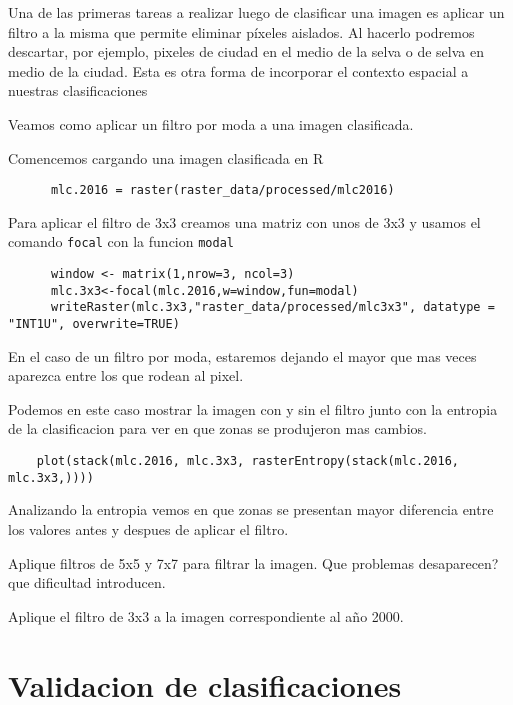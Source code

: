 Una de las primeras tareas a realizar luego de clasificar una imagen es
aplicar un filtro a la misma que permite eliminar p\'ixeles aislados. Al
hacerlo podremos descartar, por ejemplo, pixeles de ciudad en el medio de la selva
o de selva en medio de la ciudad. Esta es otra forma de incorporar el contexto
espacial a nuestras clasificaciones
\begin{exa}
  Veamos como aplicar un filtro por moda a una imagen clasificada.

  Comencemos cargando una imagen clasificada en R
  \begin{lstlisting}
      mlc.2016 = raster(raster_data/processed/mlc2016)
  \end{lstlisting}

  Para aplicar el filtro de 3x3 creamos una matriz con unos de 3x3 y usamos
  el comando \texttt{focal} con la funcion \texttt{modal}

  \begin{lstlisting}
      window <- matrix(1,nrow=3, ncol=3)
      mlc.3x3<-focal(mlc.2016,w=window,fun=modal)
      writeRaster(mlc.3x3,"raster_data/processed/mlc3x3", datatype = "INT1U", overwrite=TRUE)
  \end{lstlisting}
  En el caso de un filtro por moda, estaremos dejando el mayor que mas veces
  aparezca entre los que rodean al pixel.

  Podemos en este caso mostrar la imagen con y sin el filtro junto con la entropia
  de la clasificacion para ver en que zonas se produjeron mas cambios.

  \begin{lstlisting}
    plot(stack(mlc.2016, mlc.3x3, rasterEntropy(stack(mlc.2016, mlc.3x3,))))
  \end{lstlisting}

  Analizando la entropia vemos en que zonas se presentan mayor diferencia entre
  los valores antes y despues de aplicar el filtro.

\end{exa}
\begin{act}
    Aplique filtros de 5x5 y 7x7 para filtrar la imagen. Que problemas
    desaparecen? que dificultad introducen.
\end{act}

\begin{act}
    Aplique el filtro de 3x3 a la imagen correspondiente al año 2000.
\end{act}

\section{Validacion de clasificaciones}

